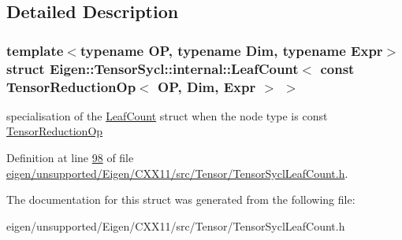 \subsection{Detailed Description}
\subsubsection*{template$<$typename OP, typename Dim, typename Expr$>$\newline
struct Eigen\+::\+Tensor\+Sycl\+::internal\+::\+Leaf\+Count$<$ const Tensor\+Reduction\+Op$<$ O\+P, Dim, Expr $>$ $>$}

specialisation of the \hyperlink{struct_eigen_1_1_tensor_sycl_1_1internal_1_1_leaf_count}{Leaf\+Count} struct when the node type is const \hyperlink{class_eigen_1_1_tensor_reduction_op}{Tensor\+Reduction\+Op} 

Definition at line \hyperlink{eigen_2unsupported_2_eigen_2_c_x_x11_2src_2_tensor_2_tensor_sycl_leaf_count_8h_source_l00098}{98} of file \hyperlink{eigen_2unsupported_2_eigen_2_c_x_x11_2src_2_tensor_2_tensor_sycl_leaf_count_8h_source}{eigen/unsupported/\+Eigen/\+C\+X\+X11/src/\+Tensor/\+Tensor\+Sycl\+Leaf\+Count.\+h}.



The documentation for this struct was generated from the following file\+:\begin{DoxyCompactItemize}
\item 
eigen/unsupported/\+Eigen/\+C\+X\+X11/src/\+Tensor/\+Tensor\+Sycl\+Leaf\+Count.\+h\end{DoxyCompactItemize}

